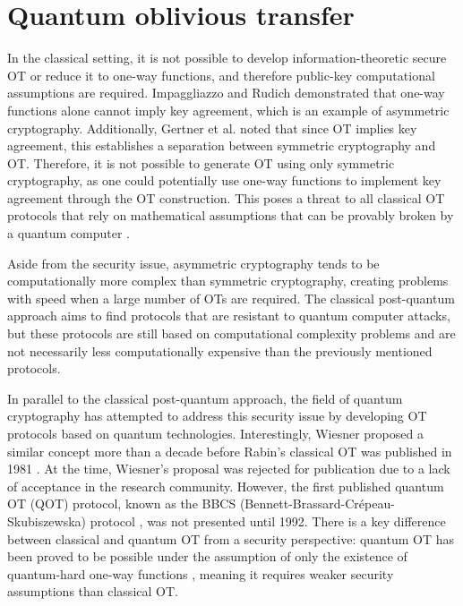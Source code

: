 


%

\chapter{Quantum oblivious transfer}
\label{chapter_QOT}


In the classical setting, it is not possible to develop information-theoretic secure OT or reduce it to one-way functions, and therefore public-key computational assumptions are required. Impaggliazzo and Rudich \cite{IR89} demonstrated that one-way functions alone cannot imply key agreement, which is an example of asymmetric cryptography. Additionally, Gertner et al. \cite{GKMRV00} noted that since OT implies key agreement, this establishes a separation between symmetric cryptography and OT. Therefore, it is not possible to generate OT using only symmetric cryptography, as one could potentially use one-way functions to implement key agreement through the OT construction. This poses a threat to all classical OT protocols \cite{EGL85, NP01, CO15} that rely on mathematical assumptions that can be provably broken by a quantum computer \cite{Sho95}.

Aside from the security issue, asymmetric cryptography tends to be computationally more complex than symmetric cryptography, creating problems with speed when a large number of OTs are required. The classical post-quantum approach aims to find protocols that are resistant to quantum computer attacks, but these protocols are still based on computational complexity problems and are not necessarily less computationally expensive than the previously mentioned protocols.

In parallel to the classical post-quantum approach, the field of quantum cryptography has attempted to address this security issue by developing OT protocols based on quantum technologies. Interestingly, Wiesner proposed a similar concept more than a decade before Rabin's classical OT was published in 1981 \cite{Rabin81}. At the time, Wiesner's proposal was rejected for publication due to a lack of acceptance in the research community. However, the first published quantum OT (QOT) protocol, known as the BBCS (Bennett-Brassard-Cr{\'e}peau-Skubiszewska) protocol \cite{BBCS92}, was not presented until 1992. There is a key difference between classical and quantum OT from a security perspective: quantum OT has been proved to be possible under the assumption of only the existence of quantum-hard one-way functions \cite{GLSV21, BCKM21}, meaning it requires weaker security assumptions than classical OT.


